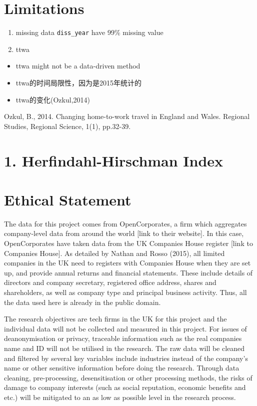\documentclass[
  12pt,
  oneside]{book}
\providecommand{\tightlist}{%
  \setlength{\itemsep}{0pt}\setlength{\parskip}{0pt}}
\begin{document}
\hypertarget{limitations}{%
\section{Limitations}\label{limitations}}

\begin{enumerate}
\def\labelenumi{\arabic{enumi}.}
\item
  missing data
  \texttt{diss\_year} have 99\% missing value
\item
  ttwa
\end{enumerate}

\begin{itemize}
\tightlist
\item
  ttwa might not be a data-driven method
\item
  ttwa的时间局限性，因为是2015年统计的
\item
  ttwa的变化(Ozkul,2014)
\end{itemize}

Ozkul, B., 2014. Changing home-to-work travel in England and Wales. Regional Studies, Regional Science, 1(1), pp.32-39.

\hypertarget{herfindahl-hirschman-index}{%
\section{1. Herfindahl-Hirschman Index}\label{herfindahl-hirschman-index}}

\hypertarget{ethical-statement}{%
\section{Ethical Statement}\label{ethical-statement}}

The data for this project comes from OpenCorporates, a firm which aggregates company-level data from around the world {[}link to their website{]}. In this case, OpenCorporates have taken data from the UK Companies House register {[}link to Companies House{]}. As detailed by Nathan and Rosso (2015), all limited companies in the UK need to registers with Companies House when they are set up, and provide annual returns and financial statements. These include details of directors and company secretary, registered office address, shares and shareholders, as well as company type and principal business activity. Thus, all the data used here is already in the public domain.

The research objectives are tech firms in the UK for this project and the individual data will not be collected and measured in this project. For issues of deanonymisation or privacy, traceable information such as the real companies name and ID will not be utilised in the research. The raw data will be cleaned and filtered by several key variables include industries instead of the company's name or other sensitive information before doing the research. Through data cleaning, pre-processing, desensitisation or other processing methods, the risks of damage to company interests (such as social reputation, economic benefits and etc.) will be mitigated to an as low as possible level in the research process.
\end{document}
